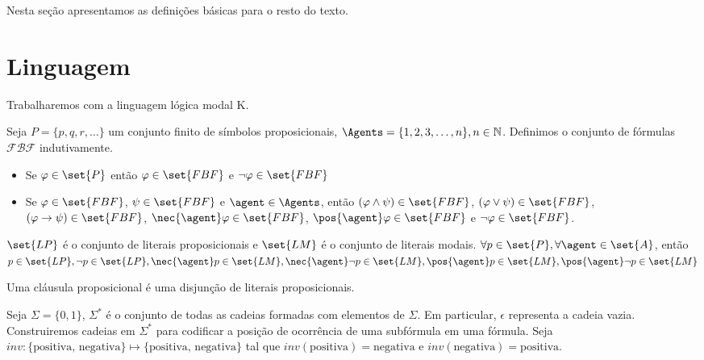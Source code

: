 
Nesta seção apresentamos as definições básicas para o resto do texto.

\section{Linguagem}
Trabalharemos com a linguagem lógica modal K.

\begin{definition}
	Seja $P = \{p, q, r, \dots\}$ um conjunto finito de símbolos proposicionais, $\Agents = \{1, 2, 3, \dots, n\}, n \in \mathbb{N}$. Definimos o conjunto de fórmulas $\mathcal{FBF}$ indutivamente.
	
	\begin{itemize}
		\item Se $\varphi \in \set{P}$ então $\varphi \in \set{FBF}$ e $\neg\varphi \in \set{FBF}$
		\item Se $\varphi \in \set{FBF}$, $\psi \in \set{FBF}$ e $\agent \in \Agents$, então $(\varphi \land \psi) \in \set{FBF}$, $(\varphi \lor \psi) \in \set{FBF}$, $(\varphi \rightarrow \psi) \in \set{FBF}$, $\nec{\agent} \varphi \in \set{FBF}$, $\pos{\agent} \varphi \in \set{FBF}$ e $\neg\varphi \in \set{FBF}$.
	\end{itemize}
\end{definition}

\begin{definition}
	$\set{LP}$ é o conjunto de literais proposicionais e $\set{LM}$ é o conjunto de literais modais.
	$\forall p \in \set{P}, \forall \agent \in \set{A}$, então $ p \in \set{LP}, \neg p \in \set{LP}, \nec{\agent} p \in \set{LM}, \nec{\agent} \neg p \in \set{LM}, \pos{\agent} p \in \set{LM}, \pos{\agent} \neg p \in \set{LM}$
\end{definition}

\begin{definition}
	Uma cláusula proposicional é uma disjunção de literais proposicionais.
\end{definition}

Seja $\Sigma = \{0, 1\}$, $\Sigma^*$ é o conjunto de todas as cadeias formadas com elementos de $\Sigma$. Em particular, $\epsilon$ representa a cadeia vazia. Construiremos cadeias em $\Sigma^*$ para codificar a posição de ocorrência de uma subfórmula em uma fórmula. Seja $inv \colon \{\text{positiva, negativa}\} \mapsto \{\text{positiva, negativa}\}$ tal que $inv(\text{positiva}) = \text{negativa}$ e $inv(\text{negativa}) = \text{positiva}$.

